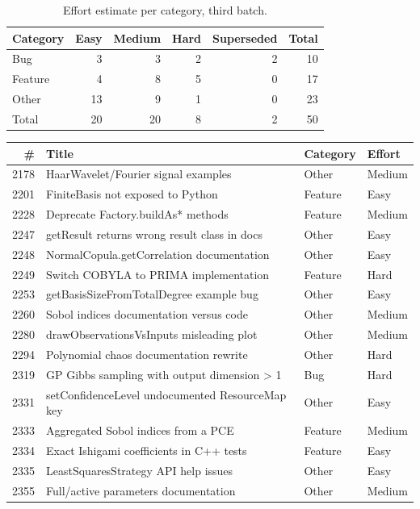 \documentclass[a4paper,11pt]{article}
\begin{document}
\begin{table}[h]
\centering
\caption{Effort estimate per category, third batch.}
\begin{tabular}{lrrrrr}
\toprule
Category & Easy & Medium & Hard & Superseded & Total \\
\midrule
Bug & 3 & 3 & 2 & 2 & 10 \\
Feature & 4 & 8 & 5 & 0 & 17 \\
Other & 13 & 9 & 1 & 0 & 23 \\
Total & 20 & 20 & 8 & 2 & 50 \\
\bottomrule
\end{tabular}
\end{table}

\footnotesize
\begin{longtable}{rp{7.6cm}ll}
\toprule
\# & Title & Category & Effort \\
\midrule
\endhead
2178 & HaarWavelet/Fourier signal examples & Other & Medium \\
2201 & FiniteBasis not exposed to Python & Feature & Easy \\
2228 & Deprecate Factory.buildAs* methods & Feature & Medium \\
2247 & getResult returns wrong result class in docs & Other & Easy \\
2248 & NormalCopula.getCorrelation documentation & Other & Easy \\
2249 & Switch COBYLA to PRIMA implementation & Feature & Hard \\
2253 & getBasisSizeFromTotalDegree example bug & Other & Easy \\
2260 & Sobol indices documentation versus code & Other & Medium \\
2280 & drawObservationsVsInputs misleading plot & Other & Medium \\
2294 & Polynomial chaos documentation rewrite & Other & Hard \\
2319 & GP Gibbs sampling with output dimension > 1 & Bug & Hard \\
2331 & setConfidenceLevel undocumented ResourceMap key & Other & Easy \\
2333 & Aggregated Sobol indices from a PCE & Feature & Medium \\
2334 & Exact Ishigami coefficients in C++ tests & Feature & Easy \\
2335 & LeastSquaresStrategy API help issues & Other & Easy \\
2355 & Full/active parameters documentation & Other & Medium \\

\end{longtable}
\end{document}
